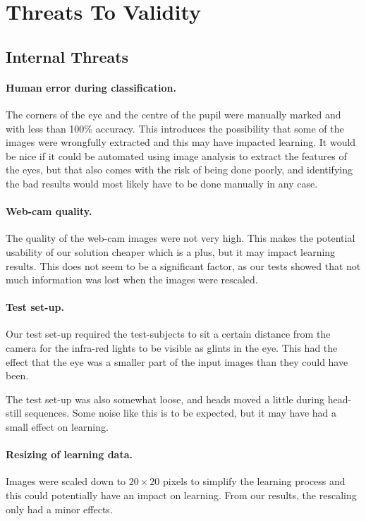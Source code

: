 \section{Threats To Validity}
\label{sec:Threats}
\subsection{Internal Threats}
\paragraph{Human error during classification.}
The corners of the eye and the centre of the pupil were manually marked and with less than 100\% accuracy.
This introduces the possibility that some of the images were wrongfully extracted and this may have impacted learning.
It would be nice if it could be automated using image analysis to extract the features of the eyes, but that also comes with the risk of being done poorly, and identifying the bad results would most likely have to be done manually in any case.

\paragraph{Web-cam quality.}
The quality of the web-cam images were not very high.
This makes the potential usability of our solution cheaper which is a plus, but it may impact learning results.
This does not seem to be a significant factor, as our tests showed that not much information was lost when the images were rescaled.

\paragraph{Test set-up.}
Our test set-up required the test-subjects to sit a certain distance from the camera for the infra-red lights to be visible as glints in the eye.
This had the effect that the eye was a smaller part of the input images than they could have been.

The test set-up was also somewhat loose, and heads moved a little during head-still sequences.
Some noise like this is to be expected, but it may have had a small effect on learning.

\paragraph{Resizing of learning data.}
Images were scaled down to $20\times 20$ pixels to simplify the learning process and this could potentially have an impact on learning.
From our results, the rescaling only had a minor effects.

